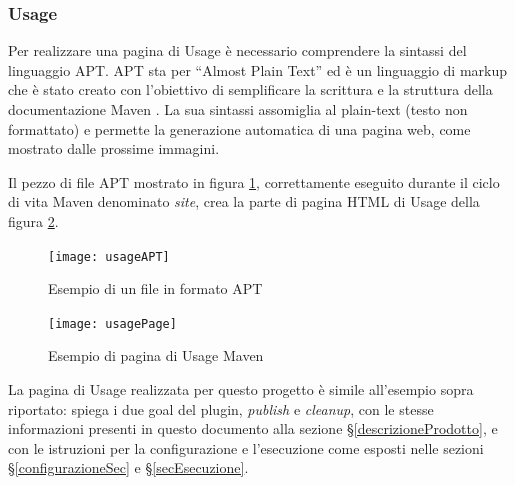         \subsubsection{Usage}
        Per realizzare una pagina di Usage è necessario comprendere la sintassi del linguaggio APT.
        APT sta per ``Almost Plain Text'' ed è un linguaggio di markup che è stato creato con l'obiettivo di semplificare la scrittura e la struttura della documentazione Maven \cite{site:apt}.
        La sua sintassi assomiglia al plain-text (testo non formattato) e permette la generazione automatica di una pagina web, come mostrato dalle prossime immagini.

        Il pezzo di file APT mostrato in figura \ref{usageAPT}, correttamente eseguito durante il ciclo di vita Maven denominato \emph{site}, crea la parte di pagina HTML di Usage della figura \ref{usageImage}.

        \begin{figure}[H]
            \centering
            \texttt{[image: usageAPT]}\\
            \caption{Esempio di un file in formato APT \cite{site:apt-file}}
            \label{usageAPT}
        \end{figure}

        \begin{figure}[H]
            \centering
            \texttt{[image: usagePage]}\\
            \caption{Esempio di pagina di Usage Maven \cite{site:maven-usage}}
            \label{usageImage}
        \end{figure}

        La pagina di Usage realizzata per questo progetto è simile all'esempio sopra riportato: spiega i due goal del plugin, \emph{publish} e \emph{cleanup}, con le stesse informazioni presenti in questo documento alla sezione \S\ref{descrizioneProdotto}, e con le istruzioni per la configurazione e l'esecuzione come esposti nelle sezioni \S\ref{configurazioneSec} e \S\ref{secEsecuzione}.

